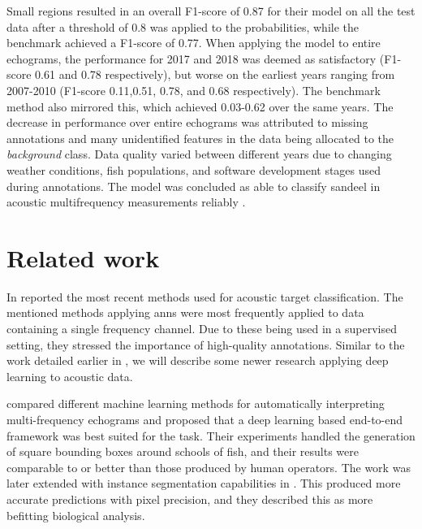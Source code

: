     Small regions resulted in an overall F1-score of 0.87 for their model on all the test data after a threshold of 0.8 was applied to the probabilities, while the benchmark achieved a F1-score of 0.77. When applying the model to entire echograms, the performance for 2017 and 2018 was deemed as satisfactory (F1-score 0.61 and 0.78 respectively), but worse on the earliest years ranging from 2007-2010 (F1-score 0.11,0.51, 0.78, and 0.68 respectively). The benchmark method also mirrored this, which achieved 0.03-0.62 over the same years. The decrease in performance over entire echograms was attributed to missing annotations and many unidentified features in the data being allocated to the \textit{background} class. Data quality varied between different years due to changing weather conditions, fish populations, and software development stages used during annotations. The model was concluded as able to classify sandeel in acoustic multifrequency measurements reliably \cite{brautaset2020acoustic}.

\section{Related work} \label{related_work}
    In \citeyear{korneliussen2018acoustic} \citet{korneliussen2018acoustic} reported the most recent methods used for acoustic target classification. The mentioned methods applying \gls{ann}s were most frequently applied to data containing a single frequency channel. Due to these being used in a supervised setting, they stressed the importance of high-quality annotations. Similar to the work detailed earlier in \citet{brautaset2020acoustic}, we will describe some newer research applying deep learning to acoustic data.
       
    \citet{marques2021detecting} compared different machine learning methods for automatically interpreting multi-frequency echograms and proposed that a deep learning based end-to-end framework was best suited for the task. Their experiments handled the generation of square bounding boxes around schools of fish, and their results were comparable to or better than those produced by human operators. The work was later extended with instance segmentation capabilities in \citeyear{marques2021instance} \cite{marques2021instance}. This produced more accurate predictions with pixel precision, and they described this as more befitting biological analysis.
     
